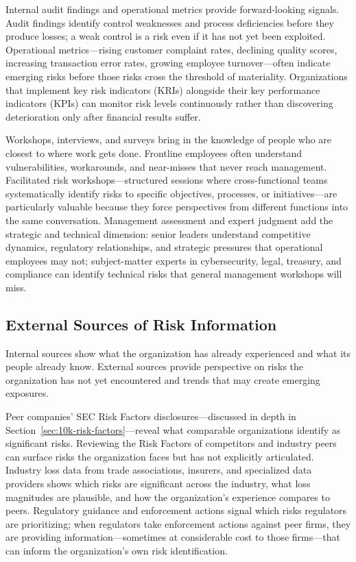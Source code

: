 \documentclass[11pt,openany]{book}
\begin{document}
Internal audit findings and operational metrics provide forward-looking signals. Audit findings identify control weaknesses and process deficiencies before they produce losses; a weak control is a risk even if it has not yet been exploited. Operational metrics---rising customer complaint rates, declining quality scores, increasing transaction error rates, growing employee turnover---often indicate emerging risks before those risks cross the threshold of materiality. Organizations that implement key risk indicators (KRIs) alongside their key performance indicators (KPIs) can monitor risk levels continuously rather than discovering deterioration only after financial results suffer.

Workshops, interviews, and surveys bring in the knowledge of people who are closest to where work gets done. Frontline employees often understand vulnerabilities, workarounds, and near-misses that never reach management. Facilitated risk workshops---structured sessions where cross-functional teams systematically identify risks to specific objectives, processes, or initiatives---are particularly valuable because they force perspectives from different functions into the same conversation. Management assessment and expert judgment add the strategic and technical dimension: senior leaders understand competitive dynamics, regulatory relationships, and strategic pressures that operational employees may not; subject-matter experts in cybersecurity, legal, treasury, and compliance can identify technical risks that general management workshops will miss.

\subsection{External Sources of Risk Information}
\label{subsec:external-sources}

Internal sources show what the organization has already experienced and what its people already know. External sources provide perspective on risks the organization has not yet encountered and trends that may create emerging exposures.

Peer companies' SEC Risk Factors disclosures---discussed in depth in Section~\ref{sec:10k-risk-factors}---reveal what comparable organizations identify as significant risks. Reviewing the Risk Factors of competitors and industry peers can surface risks the organization faces but has not explicitly articulated. Industry loss data from trade associations, insurers, and specialized data providers shows which risks are significant across the industry, what loss magnitudes are plausible, and how the organization's experience compares to peers. Regulatory guidance and enforcement actions signal which risks regulators are prioritizing; when regulators take enforcement actions against peer firms, they are providing information---sometimes at considerable cost to those firms---that can inform the organization's own risk identification.
\end{document}
